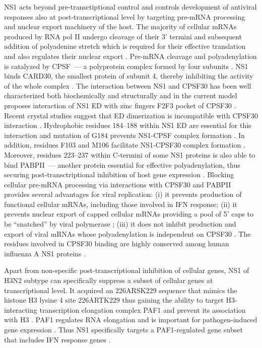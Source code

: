 		NS1 acts beyond pre-transctiptional control and controls development of antiviral responses also at post-transcriptional level by targeting pre-mRNA processing and nuclear export machinery of the host.
		The majority of cellular mRNAs produced by RNA pol II undergo cleavage of their 3' termini and subsequent addition of polyadenine stretch which is required for their effective translation and also regulates their nuclear export \parencite{Vassalli1989, Zarkower1987, Huang1996}. Pre-mRNA cleavage and polyadenylation is catalyzed by \gls{CPSF}~--- a polyprotein complex formed by four subunits \parencite{Wilusz1990, Colgan1997}. NS1 binds \gls{CARD}30, the smallest protein of subunit 4, thereby inhibiting the activity of the whole complex \parencite{Nemeroff1998}. The interaction between NS1 and CPSF30 has been well characterized both biochemically and structurally and in the current model proposes interaction of NS1 ED with zinc fingers F2F3 pocket of \gls{CPSF}30 \parencite{Noah2003, Twu2006, Kochs2007, Das2008}. Recent crystal studies suggest that ED dimerization is incompatible with \gls{CPSF}30 interaction \parencite{Aramini2011, Kerry2011}. Hydrophobic residues 184--188 within NS1 ED are essential for this interaction and mutation of G184 prevents NS1-CPSF complex formation \parencite{Das2008}. In addition, residues F103 and M106 facilitate NS1-CPSF30 complex formation \parencite{Kochs2007, Das2008}. Moreover, residues 223--237 within C-termini of some \gls{NS1} proteins is also able to bind \gls{PABP}II~--- another protein essential for effective polyadenylation, thus securing post-transctriptional inhibition of host gene expression \parencite{Li2001a}. Blocking cellular pre-mRNA processing via interactions with \gls{CPSF}30 and \gls{PABP}II provides several advantages for viral replication: (i) it prevents production of functional cellular mRNAs, including those involved in \gls{IFN} response; (ii) it prevents nuclear export of capped cellular mRNAs providing a pool of 5' caps to be ``snatched'' by viral polymerase \parencite{Nemeroff1998}; (iii) it does not inhibit production and export of viral mRNAs whose polyadenylation is independent on \gls{CPSF}30 \parencite{Plotch1977}. The residues involved in \gls{CPSF}30 binding are highly conserved among human influenza A NS1 proteins \parencite{Kochs2007, Das2008}. 
		
		Apart from non-specific post-transcriptional inhibition of cellular genes, NS1 of H3N2 subtype can specifically suppress a subset of cellular genes at transcriptional level. It acquired an \textsc{226}ARSK\textsc{229} sequence that mimics the histone H3 lysine 4 site \textsc{226}ARTK\textsc{229} thus gaining the ability to target  H3-interacting transcription elongation complex PAF1 and prevent its association with H3 \parencite{Marazzi2012}. PAF1 regulates RNA elongation and is important for pathogen-induced gene expression \parencite{Newey2009}. Thus NS1 specifically targets a PAF1-regulated gene subset that includes \gls{IFN} response genes \parencite{Marazzi2012}.
		
